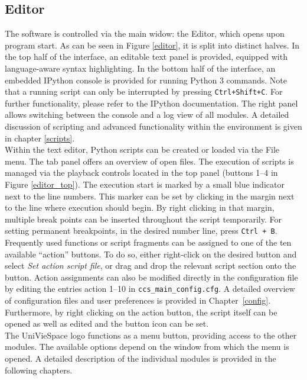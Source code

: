 \subsection{Editor}
The software is controlled via the main widow: the Editor, which opens upon program start. 
As can be seen in Figure \ref{editor}, it is split into distinct halves.
In the top half of the interface, an editable text panel is provided, equipped with language-aware syntax highlighting. 
In the bottom half of the interface, an embedded IPython console is provided for running Python 3 commands. 
Note that a running script can only be interrupted by pressing \texttt{Ctrl+Shift+C}. For further functionality, please refer to the IPython documentation. 
The right panel allows switching between the console and a log view of all modules. 
A detailed discussion of scripting and advanced functionality within the environment is given in chapter \ref{scripts}. \\

Within the text editor, Python scripts can be created or loaded via the File menu. 
The tab panel offers an overview of open files. The execution of scripts is managed via the playback controls located in the top panel (buttons 1–4 in Figure \ref{editor_top}).
The execution start is marked by a small blue indicator next to the line numbers. 
This marker can be set by clicking in the margin next to the line where execution should begin.
By right clicking in that margin, multiple break points can be inserted throughout the script temporarily. 
For setting permanent breakpoints, in the desired number line, press \texttt{Ctrl + B}.\\

Frequently used functions or script fragments can be assigned to one of the ten available “action” buttons.
To do so, either right-click on the desired button and select \textit{Set action script file}, or drag and drop the relevant script section onto the button. 
Action assignments can also be modified directly in the configuration file by editing the entries action 1–10 in \texttt{ccs\_main\_config.cfg}. 
A detailed overview of configuration files and user preferences is provided in Chapter~\ref{config}.
Furthermore, by right clicking on the action button, the script itself can be opened as well as edited and the button icon can be set.\\

The UniVieSpace logo functions as a menu button, providing access to the other modules. 
The available options depend on the window from which the menu is opened. A detailed description of the individual modules is provided in the following chapters.


